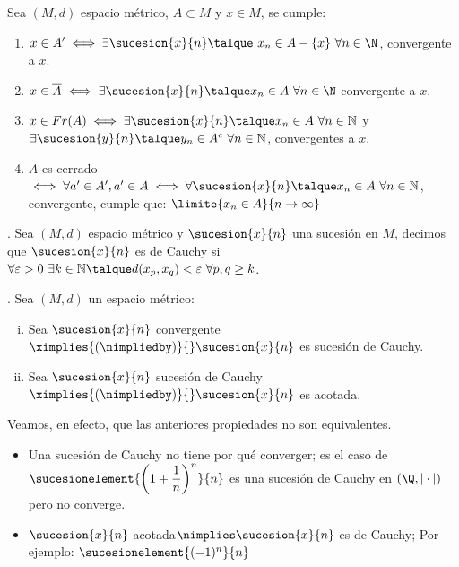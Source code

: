     \begin{proposicion}Sea $(M,d)$ espacio m\'etrico, $A\subset M$ y $x\in M$, se cumple:
   		\begin{enumerate}[1)]
    		\item $x\in A'\iff \exists \sucesion{x}{n} \talque \ x_n\in A-\{x\}\ \forall n\in \N$, convergente a $x$.
    		\item $x\in\overline{A}\iff \exists\sucesion{x}{n}\talque x_n\in A\ \forall n\in \N$ convergente a $x$.
    		\item $x\in Fr(A)\iff \exists \sucesion{x}{n}\talque x_n\in A\ \forall n\in \mathbb{N}$ y $\exists \sucesion{y}{n}\talque y_n\in A^c\ \forall n\in \mathbb{N}$, convergentes a $x$.
    		\item $A$ es cerrado $\iff \forall a'\in A', a'\in A\iff \forall \sucesion{x}{n}\talque x_n\in A\ \forall n\in \mathbb{N}$, convergente, cumple que: $\limite{x_n\in A}{n\rightarrow \infty} $
    	\end{enumerate}
    \end{proposicion}
	    
    \begin{defi}. Sea $(M,d)$ espacio m\'etrico y $\sucesion{x}{n}$ una sucesi\'on en $M$, decimos que $\sucesion{x}{n}$ \underline{es de Cauchy} si $\forall\varepsilon>0\ \exists k\in \mathbb{N}\talque d(x_p,x_q)<\varepsilon\ \forall p,q \geq k$.
    \end{defi}
	    
    \begin{proposicion}. Sea $(M,d)$ un espacio m\'etrico:
    	\begin{enumerate}[i)]
    		\item Sea $\sucesion{x}{n}$ convergente $\ximplies{(\nimpliedby)}{} \sucesion{x}{n}$ es sucesi\'on de Cauchy.
    		\item Sea $\sucesion{x}{n}$ sucesi\'on de Cauchy $\ximplies{(\nimpliedby)}{} \sucesion{x}{n}$ es acotada.
    	\end{enumerate}
    \end{proposicion}
	    
	\begin{observacion}Veamos, en efecto, que las anteriores propiedades no son equivalentes.
	    \begin{itemize}
	    		\item Una sucesi\'on de Cauchy no tiene por qu\'e converger; es el caso de $\sucesionelement{\left(1+\dfrac{1}{n}\right)^n}{n}$ es una sucesi\'on de Cauchy en $(\Q,|\cdot|)$ pero no converge.
	    		\item $\sucesion{x}{n}$ acotada$ \nimplies \sucesion{x}{n}$ es de Cauchy; Por ejemplo: $\sucesionelement{(-1)^n}{n}$
	    \end{itemize}
	\end{observacion}
	    

